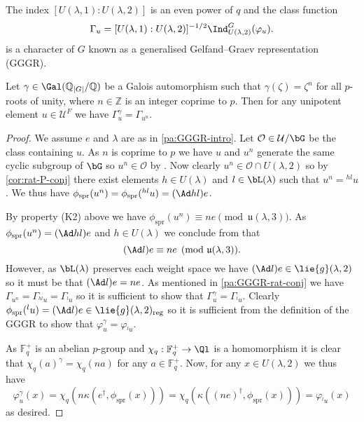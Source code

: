 \documentclass[eqthmnum, nocolour]{jt-calcs}
\begin{document}
\begin{definition}
The index $[U(\lambda,1):U(\lambda,2)]$ is an even power of $q$ and the class function
\begin{equation*}
\Gamma_u = [U(\lambda,1):U(\lambda,2)]^{-1/2}\Ind_{U(\lambda,2)}^G(\varphi_u).
\end{equation*}
is a character of $G$ known as a generalised Gelfand--Graev representation (GGGR).
\end{definition}

\begin{prop}\label{prop:galois-aut-GGGR}
Let $\gamma \in \Gal(\mathbb{Q}_{|G|}/\mathbb{Q})$ be a Galois automorphism such that $\gamma(\zeta) = \zeta^n$ for all $p$-roots of unity, where $n \in \mathbb{Z}$ is an integer coprime to $p$. Then for any unipotent element $u \in \mathcal{U}^F$ we have $\Gamma_u^{\gamma} = \Gamma_{u^n}$.
\end{prop}

\begin{proof}
We assume $e$ and $\lambda$ are as in \cref{pa:GGGR-intro}. Let $\mathcal{O} \in \mathcal{U}/\bG$ be the class containing $u$. As $n$ is coprime to $p$ we have $u$ and $u^n$ generate the same cyclic subgroup of $\bG$ so $u^n \in \mathcal{O}$ by \cite[Corollary 3]{liebeck-seitz:2012:unipotent-nilpotent-classes}. Now clearly $u^n \in \mathcal{O} \cap U(\lambda,2)$ so by \cref{cor:rat-P-conj} there exist elements $h \in U(\lambda)$ and $l \in \bL(\lambda)$ such that $u^n = {}^{hl}u$. We thus have $\phi_{\mathrm{spr}}(u^n) = \phi_{\mathrm{spr}}({}^{hl}u) = (\Ad hl)e$.

By property (K2) above we have $\phi_{\mathrm{spr}}(u^n) \equiv ne \pmod{\mathfrak{u}(\lambda,3)}$. As $\phi_{\mathrm{spr}}(u^n) = (\Ad hl)e$ and $h \in U(\lambda)$ we conclude from \cite[Lemma 10]{mcninch:2004:nilpotent-orbits-good-characteristic} that
\begin{equation*}
(\Ad l)e \equiv ne \pmod{\mathfrak{u}(\lambda,3)}.
\end{equation*}
However, as $\bL(\lambda)$ preserves each weight space we have $(\Ad l)e \in \lie{g}(\lambda,2)$ so it must be that $(\Ad l)e = ne$. As mentioned in \cref{pa:GGGR-rat-conj} we have $\Gamma_{u^n} = \Gamma_{{}^{hl}u} = \Gamma_{{}^lu}$ so it is sufficient to show that $\Gamma_u^{\gamma} = \Gamma_{{}^lu}$. Clearly $\phi_{\mathrm{spr}}({}^lu) = (\Ad l)e \in \lie{g}(\lambda,2)_{\mathrm{reg}}$ so it is sufficient from the definition of the GGGR to show that $\varphi_u^{\gamma} = \varphi_{{}^lu}$.

As $\mathbb{F}_q^+$ is an abelian $p$-group and $\chi_q : \mathbb{F}_q^+ \to \Ql$ is a homomorphism it is clear that $\chi_q(a)^{\gamma} = \chi_q(na)$ for any $a \in \mathbb{F}_q^+$. Now, for any $x \in U(\lambda,2)$ we thus have
\begin{equation*}
\varphi_u^{\gamma}(x) = \chi_q(n\kappa(e^{\dag},\phi_{\mathrm{spr}}(x))) = \chi_q(\kappa((ne)^{\dag},\phi_{\mathrm{spr}}(x))) = \varphi_{{}^lu}(x)
\end{equation*}
as desired.
\end{proof}
\end{document}
